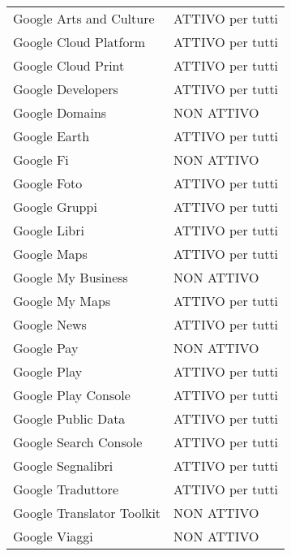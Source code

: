 \begin{center}
\begin{tabular}{ll}
Google Arts and Culture&
ATTIVO per tutti\\

Google Cloud Platform&
ATTIVO per tutti\\

Google Cloud Print&
ATTIVO per tutti\\

Google Developers&
ATTIVO per tutti\\

Google Domains&
NON ATTIVO\\

Google Earth&
ATTIVO per tutti\\

Google Fi&
NON ATTIVO\\

Google Foto&
ATTIVO per tutti\\

Google Gruppi&
ATTIVO per tutti\\

Google Libri&
ATTIVO per tutti\\

Google Maps&
ATTIVO per tutti\\

Google My Business&
NON ATTIVO\\

Google My Maps&
ATTIVO per tutti\\

Google News&
ATTIVO per tutti\\

Google Pay&
NON ATTIVO\\

Google Play&
ATTIVO per tutti\\

Google Play Console&
ATTIVO per tutti\\

Google Public Data&
ATTIVO per tutti\\

Google Search Console&
ATTIVO per tutti\\

Google Segnalibri&
ATTIVO per tutti\\

Google Traduttore&
ATTIVO per tutti\\

Google Translator Toolkit&
NON ATTIVO\\

Google Viaggi&
NON ATTIVO\\


\end{tabular}
\end{center}
